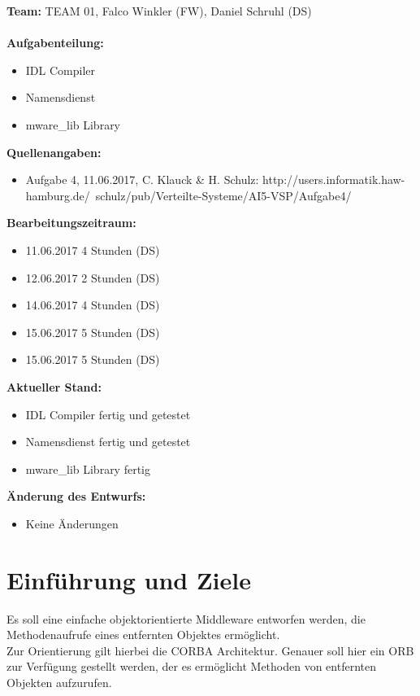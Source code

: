 \documentclass{article}
\begin{document}
\textbf{Team:} TEAM 01, Falco Winkler (FW), Daniel Schruhl (DS)\\
\\
\textbf{Aufgabenteilung:}
\begin{itemize}
    \item IDL Compiler
    \item Namensdienst
    \item mware\_lib Library
\end{itemize}

\textbf{Quellenangaben:}
\begin{itemize}
    \item Aufgabe 4, 11.06.2017, C. Klauck \& H. Schulz: \newline
    http://users.informatik.haw-hamburg.de/~schulz/pub/Verteilte-Systeme/AI5-VSP/Aufgabe4/
\end{itemize}

\textbf{Bearbeitungszeitraum:}
\begin{itemize}
	\item 11.06.2017 4 Stunden (DS)
	\item 12.06.2017 2 Stunden (DS)
	\item 14.06.2017 4 Stunden (DS)
	\item 15.06.2017 5 Stunden (DS)
	\item 15.06.2017 5 Stunden (DS)
\end{itemize}

\textbf{Aktueller Stand:}
\begin{itemize}
	\item IDL Compiler fertig und getestet
    \item Namensdienst fertig und getestet
    \item mware\_lib Library fertig
\end{itemize}

\textbf{Änderung des Entwurfs:}
\begin{itemize}
    \item Keine Änderungen
\end{itemize}

\newpage

\section{Einführung und Ziele}
Es soll eine einfache objektorientierte Middleware entworfen werden, die Methodenaufrufe
eines entfernten Objektes ermöglicht.\\

Zur Orientierung gilt hierbei die CORBA Architektur. Genauer soll hier ein ORB zur
Verfügung gestellt werden, der es ermöglicht Methoden von entfernten Objekten aufzurufen.\\
\end{document}
